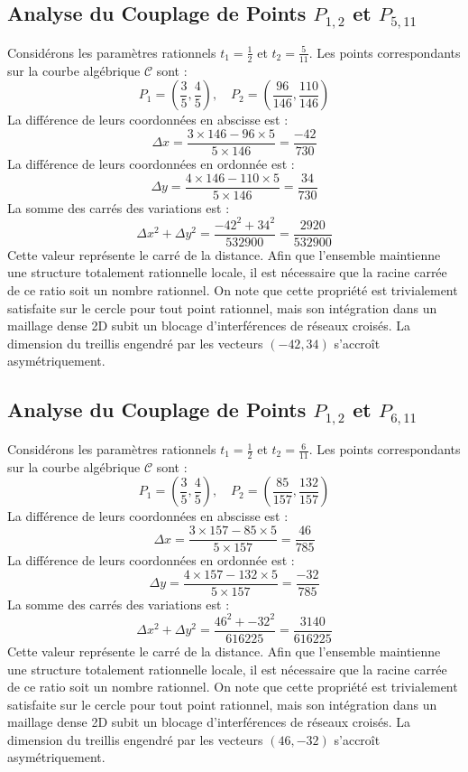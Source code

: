 \documentclass[12pt, a4paper]{article}
\begin{document}
\subsection{Analyse du Couplage de Points $P_{1,2}$ et $P_{5,11}$}
Considérons les paramètres rationnels $t_1 = \frac{1}{2}$ et $t_2 = \frac{5}{11}$.
Les points correspondants sur la courbe algébrique $\mathcal{C}$ sont :
$$ P_1 = \left( \frac{3}{5}, \frac{4}{5} \right), \quad P_2 = \left( \frac{96}{146}, \frac{110}{146} \right) $$
La différence de leurs coordonnées en abscisse est :
$$ \Delta x = \frac{3 \times 146 - 96 \times 5}{5 \times 146} = \frac{-42}{730} $$
La différence de leurs coordonnées en ordonnée est :
$$ \Delta y = \frac{4 \times 146 - 110 \times 5}{5 \times 146} = \frac{34}{730} $$
La somme des carrés des variations est :
$$ \Delta x^2 + \Delta y^2 = \frac{ -42^2 + 34^2 }{ 532900 } = \frac{ 2920 }{ 532900 } $$
Cette valeur représente le carré de la distance. Afin que l'ensemble maintienne une structure totalement rationnelle locale, il est nécessaire que la racine carrée de ce ratio soit un nombre rationnel. On note que cette propriété est trivialement satisfaite sur le cercle pour tout point rationnel, mais son intégration dans un maillage dense 2D subit un blocage d'interférences de réseaux croisés. La dimension du treillis engendré par les vecteurs $( -42, 34 )$ s'accroît asymétriquement.


\subsection{Analyse du Couplage de Points $P_{1,2}$ et $P_{6,11}$}
Considérons les paramètres rationnels $t_1 = \frac{1}{2}$ et $t_2 = \frac{6}{11}$.
Les points correspondants sur la courbe algébrique $\mathcal{C}$ sont :
$$ P_1 = \left( \frac{3}{5}, \frac{4}{5} \right), \quad P_2 = \left( \frac{85}{157}, \frac{132}{157} \right) $$
La différence de leurs coordonnées en abscisse est :
$$ \Delta x = \frac{3 \times 157 - 85 \times 5}{5 \times 157} = \frac{46}{785} $$
La différence de leurs coordonnées en ordonnée est :
$$ \Delta y = \frac{4 \times 157 - 132 \times 5}{5 \times 157} = \frac{-32}{785} $$
La somme des carrés des variations est :
$$ \Delta x^2 + \Delta y^2 = \frac{ 46^2 + -32^2 }{ 616225 } = \frac{ 3140 }{ 616225 } $$
Cette valeur représente le carré de la distance. Afin que l'ensemble maintienne une structure totalement rationnelle locale, il est nécessaire que la racine carrée de ce ratio soit un nombre rationnel. On note que cette propriété est trivialement satisfaite sur le cercle pour tout point rationnel, mais son intégration dans un maillage dense 2D subit un blocage d'interférences de réseaux croisés. La dimension du treillis engendré par les vecteurs $( 46, -32 )$ s'accroît asymétriquement.
\end{document}

